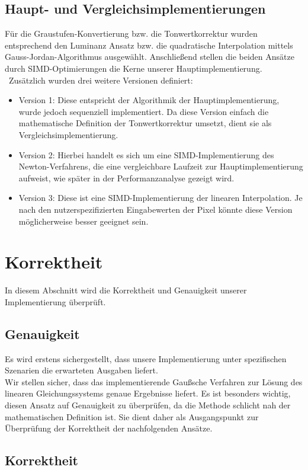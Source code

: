\documentclass[course=erap]{aspdoc}
\begin{document}
\subsection{Haupt- und Vergleichsimplementierungen}
Für die Graustufen-Konvertierung bzw. die Tonwertkorrektur wurden entsprechend den Luminanz Ansatz bzw. die quadratische Interpolation mittels Gauss-Jordan-Algorithmus ausgewählt. Anschließend stellen die beiden Ansätze durch SIMD-Optimierungen die Kerne unserer Hauptimplementierung. \
Zusätzlich wurden drei weitere Versionen definiert:
\begin{itemize}
    \item Version 1: Diese entspricht der Algorithmik der Hauptimplementierung, wurde jedoch sequenziell implementiert. Da diese Version einfach die mathematische Definition der Tonwertkorrektur umsetzt, dient sie als Vergleichsimplementierung.
    \item Version 2: Hierbei handelt es sich um eine SIMD-Implementierung des Newton-Verfahrens, die eine vergleichbare Laufzeit zur Hauptimplementierung aufweist, wie später in der Performanzanalyse gezeigt wird.
    \item Version 3: Diese ist eine SIMD-Implementierung der linearen Interpolation. Je nach den nutzerspezifizierten Eingabewerten der Pixel könnte diese Version möglicherweise besser geeignet sein.
\end{itemize}


\section{Korrektheit}
In diesem Abschnitt wird die Korrektheit und Genauigkeit unserer Implementierung überprüft.

\subsection{Genauigkeit}
Es wird erstens sichergestellt, dass unsere Implementierung unter spezifischen Szenarien die erwarteten Ausgaben liefert.\\
Wir stellen sicher, dass das implementierende Gaußsche Verfahren zur Lösung des linearen Gleichungssystems genaue Ergebnisse liefert. Es ist besonders wichtig, diesen Ansatz auf Genauigkeit zu überprüfen, da die Methode schlicht nah der mathematischen Definition ist. Sie dient daher als Ausgangspunkt zur Überprüfung der Korrektheit der nachfolgenden Ansätze.

\subsection{Korrektheit}
\end{document}
